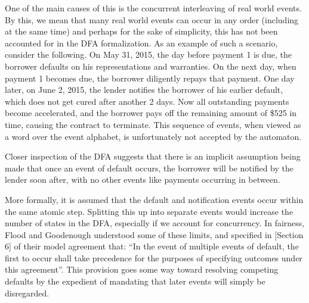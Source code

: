 \documentclass{article}
\begin{document}



One of the main causes of this is the concurrent interleaving of real
world events.
By this, we mean that many real world events can occur in any order (including
at the same time) and
perhaps for the sake of simplicity, this has not been accounted for in the DFA
formalization.
As an example of such a scenario, consider the following.
On May 31, 2015, the day before payment 1 is due, the borrower defaults on his
representations and warranties.
On the next day, when payment 1 becomes due, the borrower diligently
repays that payment.
One day later, on June 2, 2015, the lender notifies the borrower of his
earlier default, which does not get cured after another 2 days.
Now all outstanding payments become accelerated, and the borrower pays off
the remaining amount of \$525 in time, causing the contract to terminate.
This sequence of events, when viewed as a word over the event alphabet, is
unfortunately not accepted by the automaton.

Closer inspection of the DFA suggests that there is an
implicit assumption being made that once an event of default occurs,
the borrower will be notified by the lender soon after, with no other events
like payments occurring in between.

More formally, it is assumed that the default and notification events occur
within the same atomic step.
Splitting this up into separate events would increase the number of states in
the DFA, especially if we account for concurrency.
In fairness, Flood and Goodenough understood some of these limits, and specified
in \cite{contract_as_automaton}[Section 6] of their model agreement that:
``In the event of multiple events of default, the first to occur shall take
precedence for the purposes of specifying outcomes under this agreement''.
This provision goes some way toward resolving competing defaults by the
expedient of mandating that later events will simply be disregarded.
\end{document}
